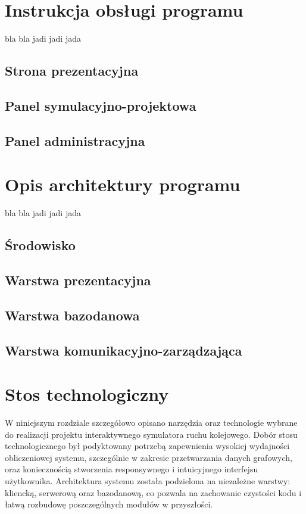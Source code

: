 \documentclass[twoside]{projektInzynierskiMS1z}
\begin{document}
\section{Instrukcja obsługi programu}
bla bla jadi jadi jada
\subsection{Strona prezentacyjna} 
\subsection{Panel symulacyjno-projektowa}
\subsection{Panel administracyjna}

\section{Opis architektury programu}
bla bla jadi jadi jada
\subsection{Środowisko}
\subsection{Warstwa prezentacyjna}
\subsection{Warstwa bazodanowa}
\subsection{Warstwa komunikacyjno-zarządzająca}

\section{Stos technologiczny}
W niniejszym rozdziale szczegółowo opisano narzędzia oraz technologie wybrane do
realizacji projektu interaktywnego symulatora ruchu kolejowego. Dobór stosu
technologicznego był podyktowany potrzebą zapewnienia wysokiej wydajności obliczeniowej
systemu, szczególnie w zakresie przetwarzania danych grafowych, oraz koniecznością
stworzenia responsywnego i intuicyjnego interfejsu użytkownika. Architektura systemu
została podzielona na niezależne warstwy: kliencką, serwerową oraz bazodanową, co
pozwala na zachowanie czystości kodu i łatwą rozbudowę poszczególnych modułów
w przyszłości.
\end{document}
